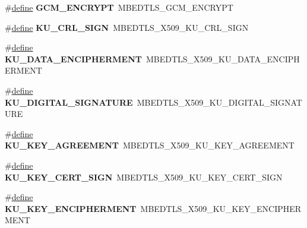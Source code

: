 \begin{DoxyCompactItemize}
\item 
\mbox{\label{compat-1_83_8h_a9ec162612f0f3a8b7e380c02ffc35867}} 
\#\hyperlink{structdefine}{define} {\bfseries G\+C\+M\+\_\+\+E\+N\+C\+R\+Y\+PT}~M\+B\+E\+D\+T\+L\+S\+\_\+\+G\+C\+M\+\_\+\+E\+N\+C\+R\+Y\+PT
\item 
\mbox{\label{compat-1_83_8h_a14185258174d3ae78dbccd55de36b0a8}} 
\#\hyperlink{structdefine}{define} {\bfseries K\+U\+\_\+\+C\+R\+L\+\_\+\+S\+I\+GN}~M\+B\+E\+D\+T\+L\+S\+\_\+\+X509\+\_\+\+K\+U\+\_\+\+C\+R\+L\+\_\+\+S\+I\+GN
\item 
\mbox{\label{compat-1_83_8h_a5d7af2d0048312e611b8af54eabd064a}} 
\#\hyperlink{structdefine}{define} {\bfseries K\+U\+\_\+\+D\+A\+T\+A\+\_\+\+E\+N\+C\+I\+P\+H\+E\+R\+M\+E\+NT}~M\+B\+E\+D\+T\+L\+S\+\_\+\+X509\+\_\+\+K\+U\+\_\+\+D\+A\+T\+A\+\_\+\+E\+N\+C\+I\+P\+H\+E\+R\+M\+E\+NT
\item 
\mbox{\label{compat-1_83_8h_a34abc95bf0fa471e18d1dd3b295492f6}} 
\#\hyperlink{structdefine}{define} {\bfseries K\+U\+\_\+\+D\+I\+G\+I\+T\+A\+L\+\_\+\+S\+I\+G\+N\+A\+T\+U\+RE}~M\+B\+E\+D\+T\+L\+S\+\_\+\+X509\+\_\+\+K\+U\+\_\+\+D\+I\+G\+I\+T\+A\+L\+\_\+\+S\+I\+G\+N\+A\+T\+U\+RE
\item 
\mbox{\label{compat-1_83_8h_a349ec0e59749ed5ca9ac9e030c06049f}} 
\#\hyperlink{structdefine}{define} {\bfseries K\+U\+\_\+\+K\+E\+Y\+\_\+\+A\+G\+R\+E\+E\+M\+E\+NT}~M\+B\+E\+D\+T\+L\+S\+\_\+\+X509\+\_\+\+K\+U\+\_\+\+K\+E\+Y\+\_\+\+A\+G\+R\+E\+E\+M\+E\+NT
\item 
\mbox{\label{compat-1_83_8h_a5da71e896dc465af98e4004ea40eb230}} 
\#\hyperlink{structdefine}{define} {\bfseries K\+U\+\_\+\+K\+E\+Y\+\_\+\+C\+E\+R\+T\+\_\+\+S\+I\+GN}~M\+B\+E\+D\+T\+L\+S\+\_\+\+X509\+\_\+\+K\+U\+\_\+\+K\+E\+Y\+\_\+\+C\+E\+R\+T\+\_\+\+S\+I\+GN
\item 
\mbox{\label{compat-1_83_8h_a64f1e2e3dd57557fdad2ca9c07f63ec4}} 
\#\hyperlink{structdefine}{define} {\bfseries K\+U\+\_\+\+K\+E\+Y\+\_\+\+E\+N\+C\+I\+P\+H\+E\+R\+M\+E\+NT}~M\+B\+E\+D\+T\+L\+S\+\_\+\+X509\+\_\+\+K\+U\+\_\+\+K\+E\+Y\+\_\+\+E\+N\+C\+I\+P\+H\+E\+R\+M\+E\+NT
\item 
\mbox{\label{compat-1_83_8h_aa97f2a6fc340bc3a22004fe7a245a1c6}} 

\end{DoxyCompactItemize}
